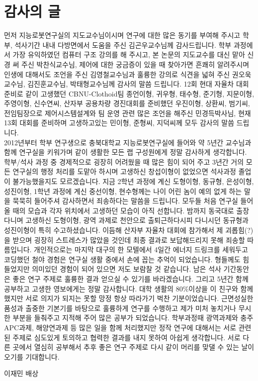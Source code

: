 \documentclass[master,korean,final]{cbnu-ecs}
\begin{document}
\chapter*{감사의 글}

먼저 지능로봇연구실의 지도교수님이시며 연구에 대한 많은 동기를 부여해 주시고 학부, 석사기간 내내 다방면에서 도움을 주신 김곤우교수님께 감사드립니다. 학부 과정에서 가장 유익하였던 컴퓨터 구조 강의를 해 주시고, 본 논문의 지도교수를 대신 맡아 신경 써 주신 박찬식교수님, 제어에 대한 궁금증이 있을 때 찾아가면 흔쾌히 알려주시며 인생에 대해서도 조언을 주신 김영철교수님과 훌륭한 강의로 식견을 넓혀 주신 권오욱교수님, 김진훈교수님, 박태형교수님께 감사의 말씀 드립니다. 12회 현대 자율차 대회 준비로 같이 고생했던 CBNU-Clothoid팀 종언이형, 귀우형, 태수형, 준기형, 지문이형, 주영이형, 신수연씨, 산자부 공용차량 경진대회를 준비했던 우진이형, 상환씨, 범기씨, 전임팀장으로 제어시스템설계와 팀 운영 관련 많은 조언을 해주신 민경득박사님, 현재 13회 대회를 준비하며 고생하고있는 민이형, 준형씨, 지덕씨께 모두 감사의 말씀 드립니다.\\
2012년부터 학부 연구생으로 충북대학교 지능로봇연구실에 들어와 약 5년간 교수님과 함께 연구실을 키워가며 같이 생활한 모든 랩 구성원에게 정말 감사하게 생각합니다. 학부/석사 과정 중 경제적으로 굉장히 어려웠을 때 많은 힘이 되어 주고 3년간 거의 모든 연구실의 행정 처리를 도맡아 하시며 고생하신 창섭이형이 없었으면 석사과정 졸업이 불가능했을지도 모르겠습니다. 지금 2학년 과정에 계신 도형이형, 동규형, 은성이형, 성진이형, 1학년 과정에 계신 중선이형, 현수형께는 나이 어린 놈이  예의 없게 하는 말을 묵묵히 들어주셔 감사하면서 죄송하다는 말씀을 드립니다. 모두들 처음 연구실 들어올 때의 모습과 각자 위치에서 고생하던 모습이 아직 선합니다. 밤까지 동국대로 출장 다니며 고생하신 도형이형, 광역 과제로 천안으로 출퇴근하다시피 다니시던 동규형과 성진이형이 특히 수고하셨습니다. 이듬해 산자부 자율차 대회에 참가해서 제 괴롭힘(?)을 받으며 굉장히 스트레스가 많았을 것인데 최종 결과로 보답해드리지 못해 죄송할 따름입니다. 개인적으로는 마지막 대구의 한 모텔에서 4일간 에너지 드링크를 세워두고 코딩했던 철야 경험은 연구실 생활 중에서 손에 꼽는 추억이 되었습니다. 형들께도 힘들었지만 의미있던 경험이 되어 있으면 저도 보람찰 것 같습니다. 남은 석사 기간동안은 좋은 연구 주제로 훌륭한 결과 얻으실 수 있기를 바라겠습니다. 그리고 5년간 함께 공부하고 고생한 영보에게는 정말 감사합니다. 대학 생활의 80\%이상을 이 친구와 함께 했지만 서로 의지가 되지는 못할 망정 항상 따라가기 벅찬 기분이었습니다. 근면성실한 품성과 출중한 기본기를 바탕으로 훌륭하게 연구를 수행하고 제가 미처 놓치거나 무시한 부분을 들춰주고 지적해 주어 많은 공부가 되었습니다. 학부과정때 광역과제와 충주APC과제, 해양연과제 등 많은 일을 함께 처리했지만 정작 연구에 대해서는 서로 관련된 주제로 심도있게 토의하고 협력한 결과를 내지 못하여 아쉽게 생각합니다. 서로 다른 곳에서 열심히 공부해서 추후 좋은 연구 주제로 다시 같이 머리를 맞댈 수 있는 날이 오기를 기대합니다.\\
\begin{flushright}
\vspace{1cm}
이재민 배상
\end{flushright}
\end{document}
